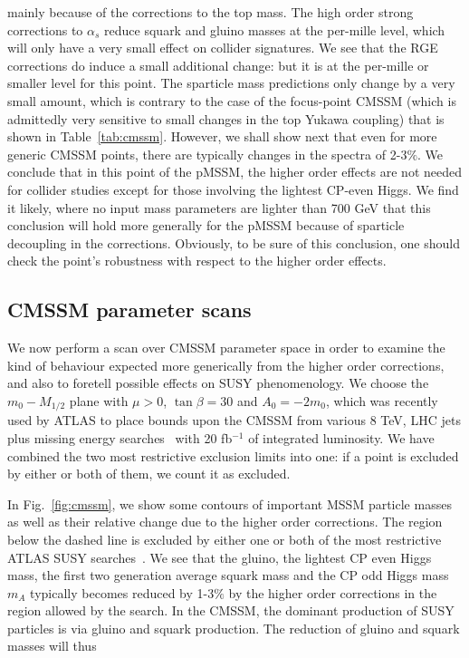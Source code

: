 \documentclass[final,3p,times,pdflatex]{elsarticle}
\begin{document}
mainly because of the  corrections to the top mass. The high order strong
corrections to $\alpha_s$ reduce
squark and gluino masses at the per-mille level, which will only have a very
small effect on collider signatures. 
We see that the RGE corrections do induce a small additional change: but it is
at the per-mille or smaller level for this point.
The sparticle mass predictions only change by a
very small amount, which is contrary to the case of the focus-point CMSSM
(which is 
admittedly very sensitive to small changes in the top Yukawa coupling) that is
shown in Table~\ref{tab:cmssm}. However, we shall show next that even for more
generic CMSSM points, there are typically changes in the spectra of 2-3$\%$.
We conclude that in this point of the pMSSM, the higher order effects are not
needed for collider studies except for those involving the lightest CP-even
Higgs. We find it likely, where no input mass parameters are lighter
than 700 GeV that this conclusion will hold more generally for the
pMSSM because of sparticle decoupling in the corrections. 
Obviously, to be sure of this conclusion, one should check the point's
robustness with respect to the higher order effects. 

\subsection{CMSSM parameter scans}

We now perform a scan over CMSSM parameter space in order to examine the kind
of behaviour expected more generically from the higher order corrections, and
also to foretell possible effects on SUSY phenomenology. We choose the
$m_0-M_{1/2}$ plane with $\mu>0$, $\tan \beta=30$ and $A_0=-2m_0$, which was
recently used by ATLAS to place bounds upon the CMSSM from various 8
TeV,  LHC jets plus missing energy
searches~\cite{ATLAS-CONF-2013-047,Aad:2013wta} with 20 fb$^{-1}$ of
integrated luminosity.  
We have combined the two most restrictive exclusion limits into one: if a
point is excluded by either or both of them, we count it as excluded. 

In Fig.~\ref{fig:cmssm}, we show some contours of important MSSM particle
masses as 
well as their relative change due to the higher order corrections. The region
below the dashed line is excluded by either one or both of the most
restrictive ATLAS SUSY searches~\cite{ATLAS-CONF-2013-047,Aad:2013wta}. 
We see that the gluino, the lightest CP even Higgs mass, the first two
generation average squark mass and
the CP odd Higgs mass $m_A$ typically becomes reduced by
1-3$\%$ by the higher order corrections in the region allowed by the search. 
In the CMSSM, the dominant production of SUSY particles is via gluino and 
squark production. The reduction of gluino and squark masses will thus 
\end{document}
